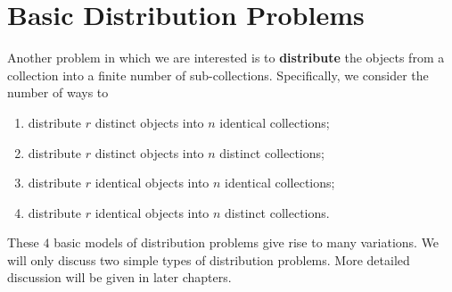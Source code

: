 \documentclass[math]{amznotes}
\theoremstyle{remark}
\begin{document}
\section{Basic Distribution Problems}
Another problem in which we are interested is to \textbf{distribute} the objects from a collection into a finite number of sub-collections. Specifically, we consider the number of ways to
\begin{enumerate}
    \item distribute $r$ distinct objects into $n$ identical collections;
    \item distribute $r$ distinct objects into $n$ distinct collections;
    \item distribute $r$ identical objects into $n$ identical collections;
    \item distribute $r$ identical objects into $n$ distinct collections.
\end{enumerate}
These $4$ basic models of distribution problems give rise to many variations. We will only discuss two simple types of distribution problems. More detailed discussion will be given in later chapters.
\end{document}
